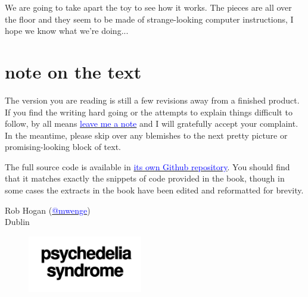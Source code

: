 We are going to take apart the toy to see how it works. The pieces are all over the floor and they seem to be made
of strange-looking computer instructions, I hope we know what we're doing...


\section*{note on the text}
The version you are reading is still a few revisions away from a
finished product. If you find the writing hard going or the attempts to explain things difficult
to follow, by all means \href{https://github.com/mwenge/psypixels/issues}{\textcolor{blue}{leave me a note}} and
I will gratefully accept your complaint. In the meantime, please skip over any blemishes
to the next pretty picture or promising-looking block of text.

The full source code is available in \href{https://github.com/mwenge/psychedelia}{\textcolor{blue}{its own Github repository}}. 
You should find that it matches exactly the snippets of code provided in the book, though in some cases the extracts in the book have been edited
and reformatted for brevity.


Rob Hogan (\href{https://mastodon.social/@mwenge}{\textcolor{blue}{@mwenge}})\\
Dublin \the\year{} \\

\clearpage
\blankpage
\vspace*{\fill}
\begin{figure}[H]
    \centering
      \includegraphics[width=5cm]{src/cover/title_page.png}%
\end{figure}
\vspace*{\fill}
\thispagestyle{empty}%
\clearpage
\blankpage

